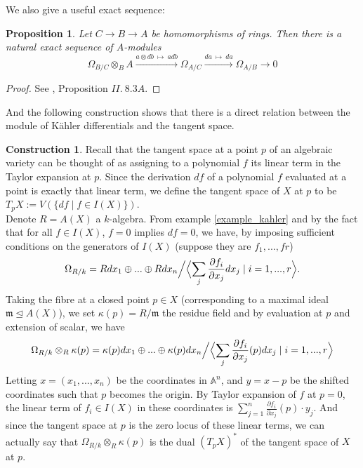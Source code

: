 \documentclass{article}
\theoremstyle{plain}
\newtheorem{proposition}[theorem]{Proposition}
\theoremstyle{definition}
\newtheorem{construction}[theorem]{Construction}
\begin{document}
\noindent We also give a useful exact sequence:

\begin{proposition}
\label{exact_seq_differential_module}
    Let $C\rightarrow B \rightarrow A$ be homomorphisms of rings.
    Then there is a natural exact sequence of $A$-modules
    $$\Omega_{B/C} \otimes_B A \xrightarrow{a\otimes db\:\mapsto\: adb} \Omega_{A/C} \xrightarrow{da\:\mapsto\:da} \Omega_{A/B} \rightarrow 0$$
\end{proposition}
\begin{proof}
    See \cite{Hartshorne}, Proposition $II.\: 8.3A$.
\end{proof}

\noindent And the following construction shows that there is a direct relation between the module of K\"ahler differentials and the tangent space. 

\begin{construction}
\label{construction_tangent_space_differential}
    Recall that the tangent space at a point $p$ of an algebraic variety can be thought of as assigning to a polynomial $f$ its linear term in the Taylor expansion at $p$. Since the derivation $df$ of a polynomial $f$ evaluated at a point is exactly that linear term, we define the tangent space of $X$ at $p$ to be $T_pX := V(\{df \mid f\in I(X)\})$.\\
    Denote $R =A(X)$ a $k$-algebra. From example \ref{example_kahler} and by the fact that for all $f\in I(X)$, $f=0$ implies $df=0$, we have, by imposing sufficient conditions on the generators of $I(X)$ (suppose they are $f_1,...,fr$) 
    $$\Omega_{R/k} = Rdx_1 \oplus ... \oplus Rdx_n \Big/ \Bigl< \sum_j \frac{\partial f_i}{\partial x_j} dx_j \mid i=1,...,r\Bigr>.$$
    Taking the fibre at a closed point $p\in X$ (corresponding to a maximal ideal $\mathfrak{m}\trianglelefteq A(X)$), we set $\kappa(p)= R/\mathfrak{m}$ the residue field and by evaluation at $p$ and extension of scalar, we have
    $$\Omega_{R/k}\otimes_R \kappa(p) = \kappa(p)dx_1 \oplus ... \oplus \kappa(p)dx_n \Big/ \Bigl< \sum_j \frac{\partial f_i}{\partial x_j}(p) dx_j \mid i=1,...,r\Bigr>$$
    Letting $x=(x_1,...,x_n)$ be the coordinates in $\mathbb{A}^n$, and $y = x-p$ be the shifted coordinates such that $p$ becomes the origin.
    By Taylor expansion of $f$ at $p=0$, the linear term of $f_i\in I(X)$ in these coordinates is $\sum_{j=1}^n \frac{\partial f_i}{\partial x_j}(p)\cdot y_j$. 
    And since the tangent space at $p$ is the zero locus of these linear terms, we can actually say that $\Omega_{R/k}\otimes_R \kappa(p)$ is the dual $(T_pX)^*$ of the tangent space of $X$ at $p$.
\end{construction}
\end{document}
